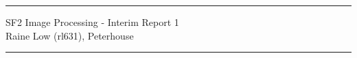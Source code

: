 \documentclass[paper = a4, 11pt]{article}
\begin{document}
\noindent
\rule{18cm}{0.3mm}
\begin{center}
    {SF2 Image Processing - Interim Report 1\\
    Raine Low (rl631), Peterhouse}
\end{center}
\rule{18cm}{0.3mm}







\end{document}
